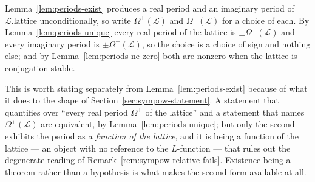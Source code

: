 \begin{definition}
  \label{def:periodpair-periods}
  Lemma~\ref{lem:periods-exist} produces a real period and an imaginary period of
  $\mathcal{L}.\mathrm{lattice}$ unconditionally, so write $\Omega^{+}(\mathcal{L})$ and
  $\Omega^{-}(\mathcal{L})$ for a choice of each. By Lemma~\ref{lem:periods-unique} every real
  period of the lattice is $\pm\Omega^{+}(\mathcal{L})$ and every imaginary period is
  $\pm\Omega^{-}(\mathcal{L})$, so the choice is a choice of sign and nothing else; and by
  Lemma~\ref{lem:periods-ne-zero} both are nonzero when the lattice is conjugation-stable.
\end{definition}

\begin{remark}
  \label{rem:periods-derived}
  This is worth stating separately from Lemma~\ref{lem:periods-exist} because of what it does to
  the shape of Section~\ref{sec:sympow-statement}. A statement that quantifies over ``every real
  period $\Omega^{+}$ of the lattice'' and a statement that names
  $\Omega^{+}(\mathcal{L})$ are equivalent, by Lemma~\ref{lem:periods-unique}; but only the
  second exhibits the period as a \emph{function of the lattice}, and it is being a function of
  the lattice --- an object with no reference to the $L$-function --- that rules out the
  degenerate reading of Remark~\ref{rem:sympow-relative-fails}. Existence being a theorem rather
  than a hypothesis is what makes the second form available at all.
\end{remark}

